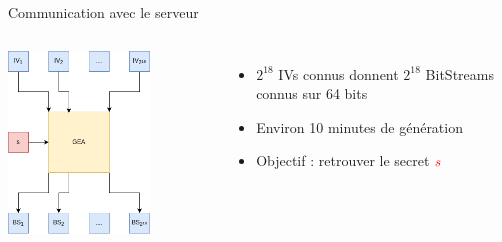 \begin{frame}{Communication avec le serveur}
    \begin{columns}
        \begin{center}                  
            \includegraphics[width=0.7\textwidth]{img/crypto/gea/server.png}
        \end{center}
        \begin{itemize}
            \item $2^{18}$ IVs connus donnent $2^{18}$ BitStreams connus sur 64 bits
            \item Environ 10 minutes de génération
            \item Objectif : retrouver le secret $\textcolor{red}{s}$
        \end{itemize}
    \end{columns}

\end{frame}


